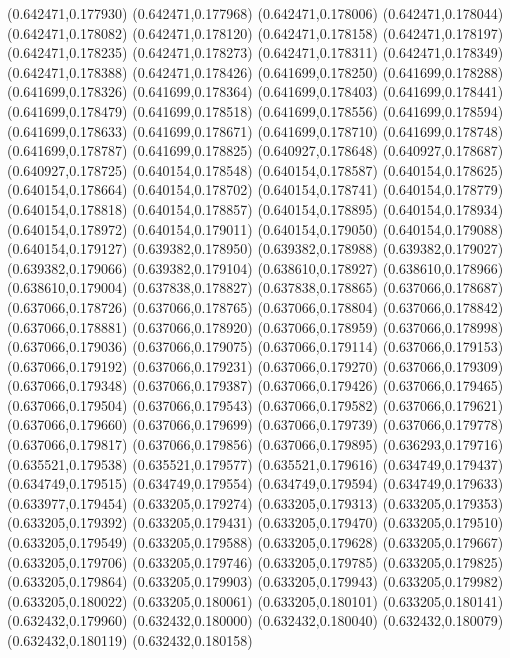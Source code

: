 (0.642471,0.177930)
(0.642471,0.177968)
(0.642471,0.178006)
(0.642471,0.178044)
(0.642471,0.178082)
(0.642471,0.178120)
(0.642471,0.178158)
(0.642471,0.178197)
(0.642471,0.178235)
(0.642471,0.178273)
(0.642471,0.178311)
(0.642471,0.178349)
(0.642471,0.178388)
(0.642471,0.178426)
(0.641699,0.178250)
(0.641699,0.178288)
(0.641699,0.178326)
(0.641699,0.178364)
(0.641699,0.178403)
(0.641699,0.178441)
(0.641699,0.178479)
(0.641699,0.178518)
(0.641699,0.178556)
(0.641699,0.178594)
(0.641699,0.178633)
(0.641699,0.178671)
(0.641699,0.178710)
(0.641699,0.178748)
(0.641699,0.178787)
(0.641699,0.178825)
(0.640927,0.178648)
(0.640927,0.178687)
(0.640927,0.178725)
(0.640154,0.178548)
(0.640154,0.178587)
(0.640154,0.178625)
(0.640154,0.178664)
(0.640154,0.178702)
(0.640154,0.178741)
(0.640154,0.178779)
(0.640154,0.178818)
(0.640154,0.178857)
(0.640154,0.178895)
(0.640154,0.178934)
(0.640154,0.178972)
(0.640154,0.179011)
(0.640154,0.179050)
(0.640154,0.179088)
(0.640154,0.179127)
(0.639382,0.178950)
(0.639382,0.178988)
(0.639382,0.179027)
(0.639382,0.179066)
(0.639382,0.179104)
(0.638610,0.178927)
(0.638610,0.178966)
(0.638610,0.179004)
(0.637838,0.178827)
(0.637838,0.178865)
(0.637066,0.178687)
(0.637066,0.178726)
(0.637066,0.178765)
(0.637066,0.178804)
(0.637066,0.178842)
(0.637066,0.178881)
(0.637066,0.178920)
(0.637066,0.178959)
(0.637066,0.178998)
(0.637066,0.179036)
(0.637066,0.179075)
(0.637066,0.179114)
(0.637066,0.179153)
(0.637066,0.179192)
(0.637066,0.179231)
(0.637066,0.179270)
(0.637066,0.179309)
(0.637066,0.179348)
(0.637066,0.179387)
(0.637066,0.179426)
(0.637066,0.179465)
(0.637066,0.179504)
(0.637066,0.179543)
(0.637066,0.179582)
(0.637066,0.179621)
(0.637066,0.179660)
(0.637066,0.179699)
(0.637066,0.179739)
(0.637066,0.179778)
(0.637066,0.179817)
(0.637066,0.179856)
(0.637066,0.179895)
(0.636293,0.179716)
(0.635521,0.179538)
(0.635521,0.179577)
(0.635521,0.179616)
(0.634749,0.179437)
(0.634749,0.179515)
(0.634749,0.179554)
(0.634749,0.179594)
(0.634749,0.179633)
(0.633977,0.179454)
(0.633205,0.179274)
(0.633205,0.179313)
(0.633205,0.179353)
(0.633205,0.179392)
(0.633205,0.179431)
(0.633205,0.179470)
(0.633205,0.179510)
(0.633205,0.179549)
(0.633205,0.179588)
(0.633205,0.179628)
(0.633205,0.179667)
(0.633205,0.179706)
(0.633205,0.179746)
(0.633205,0.179785)
(0.633205,0.179825)
(0.633205,0.179864)
(0.633205,0.179903)
(0.633205,0.179943)
(0.633205,0.179982)
(0.633205,0.180022)
(0.633205,0.180061)
(0.633205,0.180101)
(0.633205,0.180141)
(0.632432,0.179960)
(0.632432,0.180000)
(0.632432,0.180040)
(0.632432,0.180079)
(0.632432,0.180119)
(0.632432,0.180158)
